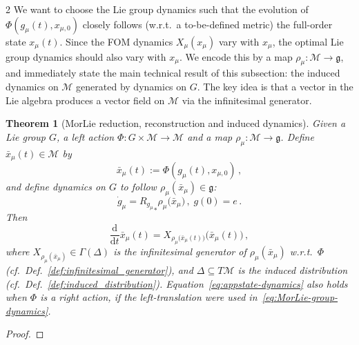 \documentclass{article}
\newtheorem{theorem}{Theorem}[section]
\newtheorem{proof}{Proof}[theorem]
\newcommand{\M}{\mathcal{M}}                                %
\newcommand{\g}{\mathfrak{g}}                               %
\newcommand{\state}{x}
\newcommand{\appstate}{\bar{x}}
\newcommand{\ext}{\text{d}}                                 %
\begin{document}
\begin{multicols}{2}
We want to choose the Lie group dynamics such that the evolution of $\Phi(g_\mu(t), \state_{\mu,0})$ closely follows (w.r.t.\ a to-be-defined metric) the full-order state $\state_\mu(t)$. Since the FOM dynamics $X_\mu(\state_\mu)$ vary with $\state_\mu$, the optimal Lie group dynamics should also vary with $\state_\mu$. We encode this by a map $\rho_\mu:\M\rightarrow\g$, and immediately state the main technical result of this subsection: the induced dynamics on $\M$ generated by dynamics on $G$. The key idea is that a vector in the Lie algebra produces a vector field on $\M$ via the infinitesimal generator.  %
%
\begin{theorem}[MorLie reduction, reconstruction and induced dynamics]\label{thm:MorLie reconstruction}
    Given a Lie group $G$, a left action $\Phi:G\times\M\rightarrow\M$ and a map $\rho_\mu:\M\rightarrow\g$. Define $\appstate_\mu(t) \in \M$ by 
    \begin{equation}\label{eq:MorLie-Reconstruction} %
        \appstate_\mu(t) := \Phi(g_\mu(t),\state_{\mu,0})\,,
    \end{equation} 
    and define dynamics on $G$ to follow $\rho_\mu(\appstate_\mu) \in\g$: 
    \begin{equation}\label{eq:MorLie-group-dynamics} %
        \dot{g}_\mu = {R_{g_\mu}}_* \rho_\mu\big(\appstate_\mu\big)\,,\; g(0) = e \,.
    \end{equation}
    Then%
    \begin{equation}\label{eq:appstate-dynamics}
        \frac{\ext}{\ext t} \appstate_\mu(t) = 
        X_{\rho_\mu\big(\appstate_\mu(t)\big)}\big(\appstate_\mu(t)\big)\,,
    \end{equation} 
    where $X_{\rho_\mu(\appstate_\mu)} \in \Gamma(\Delta)$ is the infinitesimal generator of $\rho_\mu(\appstate_\mu)$ w.r.t.\ $\Phi$ (cf.\ Def.~\ref{def:infinitesimal_generator}), and $\Delta\subseteq T\M$ is the induced distribution (cf.\ Def.~\ref{def:induced_distribution}). Equation~\eqref{eq:appstate-dynamics} also holds when $\Phi$ is a right action, if the left-translation were used in~\eqref{eq:MorLie-group-dynamics}. 
\end{theorem}
\begin{proof}

\end{proof}
\end{multicols}
\end{document}
